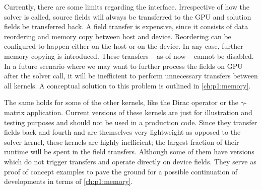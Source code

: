 Currently, there are some limits regarding the interface.
Irrespective of how the solver is called, source fields will always be transferred to the GPU and solution fields be transferred back.
A field transfer is expensive, since it consists of data reordering and memory copy between host and device.
Reordering can be configured to happen either on the host or on the device.
In any case, further memory copying is introduced.
These transfers -- as of now -- cannot be disabled.
In a future scenario where we may want to further process the fields on GPU after the solver call, it will be inefficient to perform unnecessary transfers between all kernels.
A conceptual solution to this problem is outlined in \cref{ch:p1:memory}.

The same holds for some of the other kernels, like the Dirac operator or the $\gamma$-matrix application.
Current versions of these kernels are just for illustration and testing purposes and should not be used in a production code.
Since they transfer fields back and fourth and are themselves very lightweight as opposed to the solver kernel, these kernels are highly inefficient; the largest fraction of their runtime will be spent in the field transfers.
Although some of them have versions which do not trigger transfers and operate directly on device fields.
They serve as proof of concept examples to pave the ground for a possible continuation of developments in terms of \cref{ch:p1:memory}.

